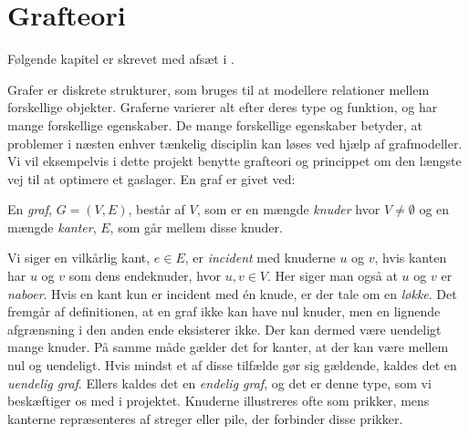 \chapter{Grafteori} \label{kap:grafteori}
Følgende kapitel er skrevet med afsæt i \citep{dmat}.

Grafer er diskrete strukturer, som bruges til at modellere relationer mellem forskellige objekter.  Graferne varierer alt efter deres type og funktion, og har mange forskellige egenskaber. De mange forskellige egenskaber betyder, at problemer i næsten enhver tænkelig disciplin kan løses ved hjælp af grafmodeller. Vi vil eksempelvis i dette projekt benytte grafteori og princippet om den længste vej til at optimere et gaslager. En graf er givet ved:
\begin{defn}[Graf]
En \emph{graf}, $G = (V,E)$, består af $V$, som er en mængde \emph{knuder} hvor $V \neq \emptyset$ og en mængde \emph{kanter}, $E$, som går mellem disse knuder. 
\end{defn}

Vi siger en vilkårlig kant, $e \in E$, er \emph{incident} med knuderne $u$ og $v$, hvis kanten har $u$ og $v$ som dens endeknuder, hvor $u, v \in V$. Her siger man også at $u$ og $v$ er \emph{naboer}. Hvis en kant kun er incident med én knude, er der tale om en \emph{løkke}.
Det fremgår af definitionen, at en graf ikke kan have nul knuder, men en lignende afgrænsning i den anden ende eksisterer ikke. Der kan dermed være uendeligt mange knuder. På samme måde gælder det for kanter, at der kan være mellem nul og uendeligt. Hvis mindst et af disse tilfælde gør sig gældende, kaldes det en \emph{uendelig graf}. Ellers kaldes det en \emph{endelig graf}, og det er denne type, som vi beskæftiger os med i projektet.
Knuderne illustreres ofte som prikker, mens kanterne repræsenteres af streger eller pile, der forbinder disse prikker. 















